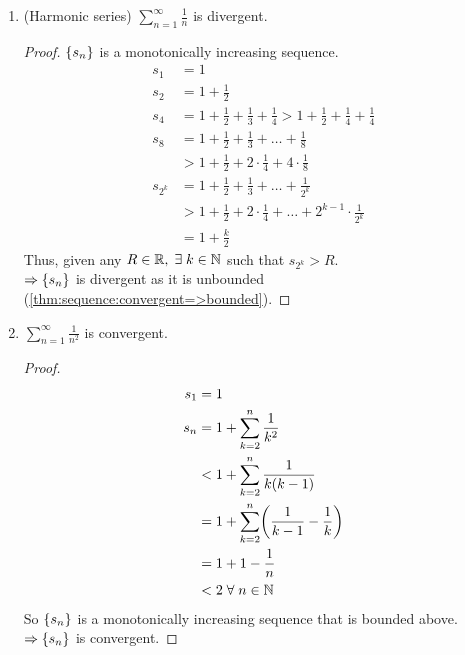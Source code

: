 \begin{example} \leavevmode
    \begin{enumerate}[label=(\alph*)]
        \item (Harmonic series) $\sum_{n=1}^{\infty} \frac{1}{n}$ is divergent.
        \begin{proof}
            $\set{s_{n}}$ is a monotonically increasing sequence.
            \begin{align*}
                s_{1} &= 1 \\
                s_{2} &= 1 + \frac{1}{2} \\
                s_{4} &= 1 + \frac{1}{2} + \frac{1}{3} + \frac{1}{4} > 1 + \frac{1}{2} + \frac{1}{4} + \frac{1}{4} \\
                s_{8} &= 1 + \frac{1}{2} + \frac{1}{3} + \dots + \frac{1}{8} \\
                   &> 1 + \frac{1}{2} + 2 \cdot \frac{1}{4} + 4 \cdot \frac{1}{8} \\
                s_{2^{k}} &= 1 + \frac{1}{2} + \frac{1}{3} + \dots + \frac{1}{2^{k}} \\
                   &> 1 + \frac{1}{2} + 2 \cdot \frac{1}{4} + \dots + 2^{k-1} \cdot \frac{1}{2^{k}} \\
                   &= 1 + \frac{k}{2}
            \end{align*}
            Thus, given any $R \in \mathbb{R}, \;\exists\; k \in \mathbb{N}$ such that $s_{2^{k}} > R$. \\
            $\implies \set{s_{n}}$ is divergent as it is unbounded (\cref{thm:sequence:convergent=>bounded}).
        \end{proof}
        \item $\sum_{n=1}^{\infty} \frac{1}{n^{2}}$ is convergent.
        \begin{proof}
            \begin{align*}
                s_{1} &= 1 \\
                s_{n} &= 1 + \sum_{k=2}^{n} \frac{1}{k^{2}} \\
                &< 1 + \sum_{k=2}^{n} \frac{1}{k(k-1)} \\
                &= 1 + \sum_{k=2}^{n} \paren{\frac{1}{k-1} - \frac{1}{k}} \\
                &= 1 + 1 - \frac{1}{n} \\
                &< 2 \;\forall\; n \in \N
            \end{align*}
            So $\set{s_{n}}$ is a monotonically increasing sequence that is bounded above. \\
            $\implies \set{s_{n}}$ is convergent.
        \end{proof}
    \end{enumerate}
\end{example}

